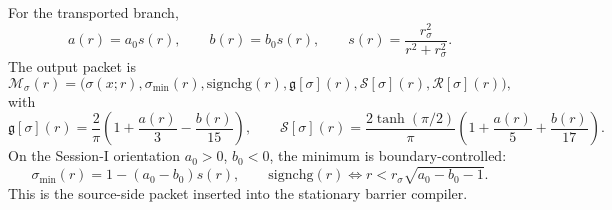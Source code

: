 For the transported branch,
\begin{equation}
\label{eq:app-part08-stage246-transport}
a(r)=a_0s(r),
\qquad
b(r)=b_0s(r),
\qquad
s(r)=\frac{r_\sigma^2}{r^2+r_\sigma^2}.
\end{equation}
The output packet is
\begin{equation}
\label{eq:app-part08-stage246-msigma-packet}
\mathcal M_\sigma(r)=
\bigl(
\sigma(x;r),
\sigma_{\min}(r),
\mathrm{signchg}(r),
\mathfrak g[\sigma](r),
\mathcal S[\sigma](r),
\mathcal R[\sigma](r)
\bigr),
\end{equation}
with
\begin{equation}
\label{eq:app-part08-stage246-transported-moments}
\mathfrak g[\sigma](r)
=
\frac{2}{\pi}\left(1+\frac{a(r)}{3}-\frac{b(r)}{15}\right),
\qquad
\mathcal S[\sigma](r)
=
\frac{2\tanh(\pi/2)}{\pi}\left(1+\frac{a(r)}{5}+\frac{b(r)}{17}\right).
\end{equation}
On the Session-I orientation \(a_0>0\), \(b_0<0\), the minimum is boundary-controlled:
\begin{equation}
\label{eq:app-part08-stage246-session-sign-threshold}
\sigma_{\min}(r)=1-(a_0-b_0)s(r),
\qquad
\mathrm{signchg}(r)\iff r<r_\sigma\sqrt{a_0-b_0-1}.
\end{equation}
This is the source-side packet inserted into the stationary barrier compiler.
